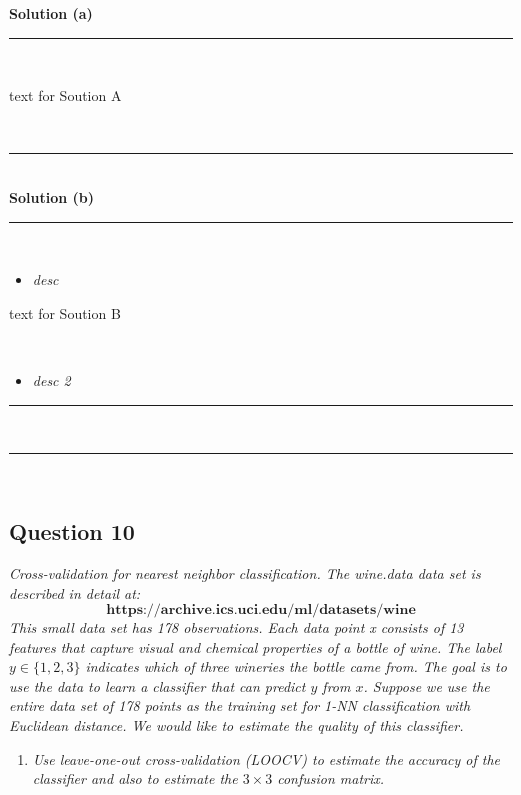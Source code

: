 \documentclass{article}
\begin{document}
\textbf{Solution (a)}

\noindent\rule{\textwidth}{0.4pt}\\

\parbox{\textwidth}{text for Soution A}\\

\noindent\rule{\textwidth}{0.4pt}\\

\textbf{Solution (b)}

\noindent\rule{\textwidth}{0.4pt}\\

\begin{itemize}
    \item \textit{desc}
\end{itemize}

\parbox{\textwidth}{text for Soution B}\\

\begin{itemize}
    \item \textit{desc 2}
\end{itemize}

\noindent\rule{\textwidth}{0.4pt}\\
\noindent\rule{\textwidth}{0.4pt}\\

\newpage
\subsection*{Question 10}
\textit{Cross-validation for nearest neighbor classification.
The wine.data data set is described in detail at:\newline \newline$$\textbf{https://archive.ics.uci.edu/ml/datasets/wine}$$
\newline This small data set has 178 observations. Each data point x consists of 13 features that capture visual
and chemical properties of a bottle of wine. The label $y \in \{1,2,3\}$ indicates which of three wineries
the bottle came from. The goal is to use the data to learn a classifier that can predict $y$ from $x$.\newline
\newline Suppose we use the entire data set of 178 points as the training set for 1-NN classification with Euclidean distance. We would like to estimate the quality of this classifier.}\\

\begin{enumerate}[label=(a)]
  \item \textit{Use leave-one-out cross-validation (LOOCV) to estimate the accuracy of the classifier and also
to estimate the $3 \times3$ confusion matrix.}
\end{enumerate}
\end{document}
